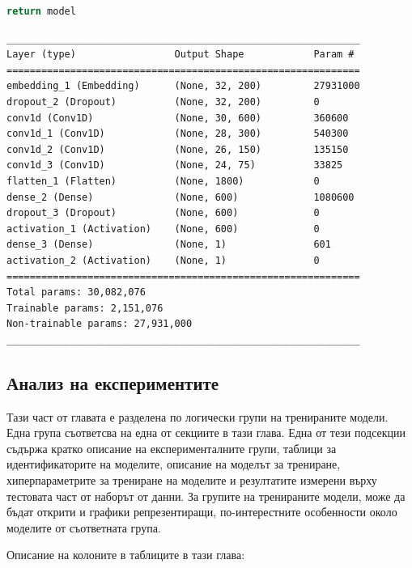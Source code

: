 \documentclass{article}
\begin{document}
\begin{itemize}
\begin{lstlisting}[language=Python, caption=Дефиниция на cnn-classifier-1.]
return model
\end{lstlisting}

\begin{lstlisting}[numbers=none, caption=Обобщение на cnn-classifier-1.]
_____________________________________________________________
Layer (type)                 Output Shape            Param #
=============================================================
embedding_1 (Embedding)      (None, 32, 200)         27931000
dropout_2 (Dropout)          (None, 32, 200)         0
conv1d (Conv1D)              (None, 30, 600)         360600
conv1d_1 (Conv1D)            (None, 28, 300)         540300
conv1d_2 (Conv1D)            (None, 26, 150)         135150
conv1d_3 (Conv1D)            (None, 24, 75)          33825
flatten_1 (Flatten)          (None, 1800)            0
dense_2 (Dense)              (None, 600)             1080600
dropout_3 (Dropout)          (None, 600)             0
activation_1 (Activation)    (None, 600)             0
dense_3 (Dense)              (None, 1)               601
activation_2 (Activation)    (None, 1)               0
=============================================================
Total params: 30,082,076
Trainable params: 2,151,076
Non-trainable params: 27,931,000
_____________________________________________________________
\end{lstlisting}

\end{itemize}

\subsection{Анализ на експериментите}

Тази част от главата е разделена по логически групи на тренираните модели. Една група съответсва на една от секциите в
тази глава. Една от тези подсекции съдържа кратко описание на експерименталните групи, таблици за идентификаторите на
моделите, описание на моделът за трениране, хиперпараметрите за трениране на моделите и резултатите измерени върху
тестовата част от наборът от данни. За групите на тренираните модели, може да бъдат открити и графики репрезентиращи,
по-интерестните особенности около моделите от съответната група.

Описание на колоните в таблиците в тази глава:
\end{document}
